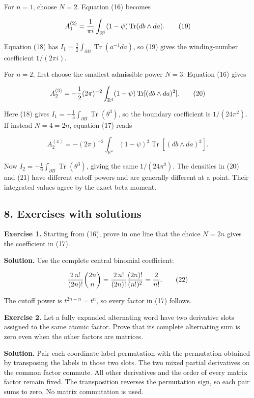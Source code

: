 \documentclass[
  11pt,
]{article}
\begin{document}
For \(n=1\), choose \(N=2\). Equation (16) becomes

\[
 A_1^{(2)}={1\over\pi i}
  \int_{\mathbb R^2}(1-\psi)\operatorname{Tr}(db\wedge da).
 \tag{19}
\]

Equation (18) has
\(I_1=\tfrac12\int_{\partial B}\operatorname{Tr}(a^{-1}da)\), so (19)
gives the winding-number coefficient \(1/(2\pi i)\).

For \(n=2\), first choose the smallest admissible power \(N=3\).
Equation (16) gives

\[
 A_2^{(3)}=-{1\over2}(2\pi)^{-2}
  \int_{\mathbb R^4}(1-\psi)
    \operatorname{Tr}[(db\wedge da)^2].
 \tag{20}
\]

Here (18) gives
\(I_1=-\tfrac13\int_{\partial B}\operatorname{Tr}(\theta^3)\), so the
boundary coefficient is \(1/(24\pi^2)\). If instead \(N=4=2n\), equation
(17) reads

\[
 A_2^{(4)}=-(2\pi)^{-2}
  \int_{\mathbb R^4}(1-\psi)^2
    \operatorname{Tr}[(db\wedge da)^2].
 \tag{21}
\]

Now \(I_2=-\tfrac16\int_{\partial B}\operatorname{Tr}(\theta^3)\),
giving the same \(1/(24\pi^2)\). The densities in (20) and (21) have
different cutoff powers and are generally different at a point. Their
integrated values agree by the exact beta moment.

\subsection{8. Exercises with solutions}\label{exercises-with-solutions}

\textbf{Exercise 1.} Starting from (16), prove in one line that the
choice \(N=2n\) gives the coefficient in (17).

\textbf{Solution.} Use the complete central binomial coefficient:

\[
 {2\,n!\over(2n)!}\binom{2n}{n}
 ={2\,n!\over(2n)!}{(2n)!\over(n!)^2}
 ={2\over n!}.
 \tag{22}
\]

The cutoff power is \(t^{2n-n}=t^n\), so every factor in (17) follows.

\textbf{Exercise 2.} Let a fully expanded alternating word have two
derivative slots assigned to the same atomic factor. Prove that its
complete alternating sum is zero even when the other factors are
matrices.

\textbf{Solution.} Pair each coordinate-label permutation with the
permutation obtained by transposing the labels in those two slots. The
two mixed partial derivatives on the common factor commute. All other
derivatives and the order of every matrix factor remain fixed. The
transposition reverses the permutation sign, so each pair sums to zero.
No matrix commutation is used.
\end{document}
